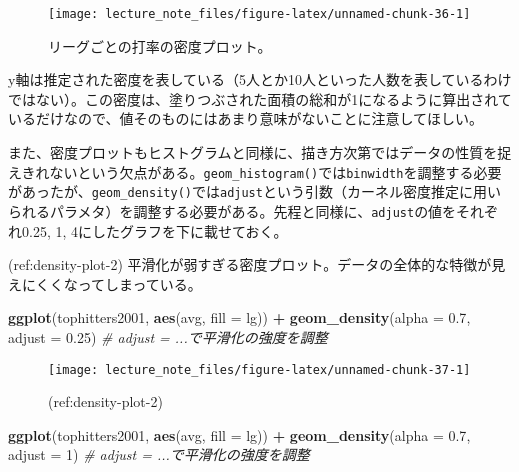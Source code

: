 \documentclass[]{book}
\newenvironment{Shaded}{\begin{snugshade}}{\end{snugshade}}
\newcommand{\KeywordTok}[1]{\textcolor[rgb]{0.13,0.29,0.53}{\textbf{#1}}}
\newcommand{\DataTypeTok}[1]{\textcolor[rgb]{0.13,0.29,0.53}{#1}}
\newcommand{\DecValTok}[1]{\textcolor[rgb]{0.00,0.00,0.81}{#1}}
\newcommand{\FloatTok}[1]{\textcolor[rgb]{0.00,0.00,0.81}{#1}}
\newcommand{\StringTok}[1]{\textcolor[rgb]{0.31,0.60,0.02}{#1}}
\newcommand{\CommentTok}[1]{\textcolor[rgb]{0.56,0.35,0.01}{\textit{#1}}}
\newcommand{\OperatorTok}[1]{\textcolor[rgb]{0.81,0.36,0.00}{\textbf{#1}}}
\newcommand{\NormalTok}[1]{#1}
\begin{document}
\begin{figure}

{\centering \texttt{[image: lecture\_note\_files/figure-latex/unnamed-chunk-36-1]} 

}

\caption{リーグごとの打率の密度プロット。}\label{fig:unnamed-chunk-36}
\end{figure}

y軸は推定された密度を表している（5人とか10人といった人数を表しているわけではない）。この密度は、塗りつぶされた面積の総和が1になるように算出されているだけなので、値そのものにはあまり意味がないことに注意してほしい。

また、密度プロットもヒストグラムと同様に、描き方次第ではデータの性質を捉えきれないという欠点がある。\texttt{geom\_histogram()}では\texttt{binwidth}を調整する必要があったが、\texttt{geom\_density()}では\texttt{adjust}という引数（カーネル密度推定に用いられるパラメタ）を調整する必要がある。先程と同様に、\texttt{adjust}の値をそれぞれ0.25,
1, 4にしたグラフを下に載せておく。

(ref:density-plot-2)
平滑化が弱すぎる密度プロット。データの全体的な特徴が見えにくくなってしまっている。

\begin{Shaded}
\begin{Highlighting}[]
\KeywordTok{ggplot}\NormalTok{(tophitters2001, }\KeywordTok{aes}\NormalTok{(avg, }\DataTypeTok{fill =}\NormalTok{ lg)) }\OperatorTok{+}
\StringTok{  }\KeywordTok{geom_density}\NormalTok{(}\DataTypeTok{alpha =} \FloatTok{0.7}\NormalTok{, }\DataTypeTok{adjust =} \FloatTok{0.25}\NormalTok{) }\CommentTok{# adjust = ...で平滑化の強度を調整}
\end{Highlighting}
\end{Shaded}

\begin{figure}

{\centering \texttt{[image: lecture\_note\_files/figure-latex/unnamed-chunk-37-1]} 

}

\caption{(ref:density-plot-2)}\label{fig:unnamed-chunk-37}
\end{figure}



\begin{Shaded}
\begin{Highlighting}[]
\KeywordTok{ggplot}\NormalTok{(tophitters2001, }\KeywordTok{aes}\NormalTok{(avg, }\DataTypeTok{fill =}\NormalTok{ lg)) }\OperatorTok{+}
\StringTok{  }\KeywordTok{geom_density}\NormalTok{(}\DataTypeTok{alpha =} \FloatTok{0.7}\NormalTok{, }\DataTypeTok{adjust =} \DecValTok{1}\NormalTok{) }\CommentTok{# adjust = ...で平滑化の強度を調整}
\end{Highlighting}
\end{Shaded}
\end{document}
